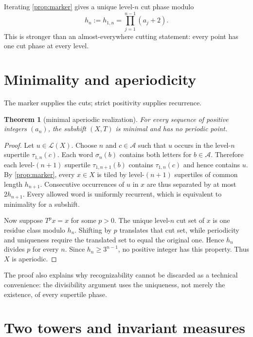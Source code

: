 \documentclass[11pt,a4paper]{amsart}
\newtheorem{theorem}{Theorem}[section]
\theoremstyle{definition}
\theoremstyle{remark}
\newcommand{\A}{\mathcal A}
\newcommand{\Lcal}{\mathcal L}
\begin{document}
Iterating \cref{prop:marker} gives a unique level-$n$ cut phase modulo
\begin{equation}\label{eq:height}
 h_n:=h_{1,n}=\prod_{j=1}^{n-1}(a_j+2).
\end{equation}
This is stronger than an almost-everywhere cutting statement: every point
has one cut phase at every level.

\section{Minimality and aperiodicity}

The marker supplies the cuts; strict positivity supplies recurrence.

\begin{theorem}[minimal aperiodic realization]\label{thm:minimal}
For every sequence of positive integers $(a_n)$, the subshift $(X,T)$ is
minimal and has no periodic point.
\end{theorem}

\begin{proof}
Let $u\in\Lcal(X)$.  Choose $n$ and $c\in\A$ such that $u$ occurs in the
level-$n$ supertile $\tau_{1,n}(c)$.  Each word $\sigma_n(b)$ contains both
letters for $b\in\A$.  Therefore each level-$(n+1)$ supertile
$\tau_{1,n+1}(b)$ contains $\tau_{1,n}(c)$ and hence contains $u$.  By
\cref{prop:marker}, every $x\in X$ is tiled by level-$(n+1)$ supertiles of
common length $h_{n+1}$.  Consecutive occurrences of $u$ in $x$ are thus
separated by at most $2h_{n+1}$.  Every allowed word is uniformly recurrent,
which is equivalent to minimality for a subshift.

Now suppose $T^p x=x$ for some $p>0$.  The unique level-$n$ cut set of $x$
is one residue class modulo $h_n$.  Shifting by $p$ translates that cut set,
while periodicity and uniqueness require the translated set to equal the
original one.  Hence $h_n$ divides $p$ for every $n$.  Since $h_n\geq
3^{n-1}$, no positive integer has this property.  Thus $X$ is aperiodic.
\end{proof}

The proof also explains why recognizability cannot be discarded as a
technical convenience: the divisibility argument uses the uniqueness, not
merely the existence, of every supertile phase.

\section{Two towers and invariant measures}
\end{document}

